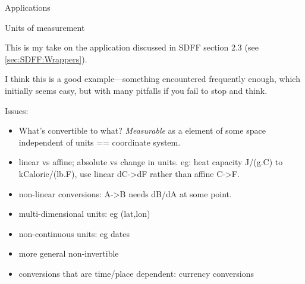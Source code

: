 \documentclass[12pt]{PalisadesLakesBook}
\begin{document}
\begin{plSection}{Applications}
\begin{plSection}{Units of measurement}\label{sec:UOM}

This is my take on the application discussed in SDFF section 2.3
(see \cref{sec:SDFF:Wrappers}).

I think this is a good example---something encountered
frequently enough, which initially seems easy,
but with many pitfalls if you fail to stop and think.

Issues:
\begin{itemize}
  \item What's convertible to what? 
  \emph{Measurable} as a element of some space independent of
  units == coordinate system.
  \item linear vs affine; absolute vs change in units.
  eg: heat capacity J/(g.C) to kCalorie/(lb.F),
  use linear dC->dF rather than affine C->F.
  \item non-linear conversions: A->B needs dB/dA at some point.
  \item multi-dimensional units: eg (lat,lon)
  \item non-continuous units: eg dates
  \item more general non-invertible
  \item conversions that are time/place dependent: 
  currency conversions
\end{itemize}
 
\end{plSection}%
\end{plSection}%
\BeginAppendices

\end{document}
